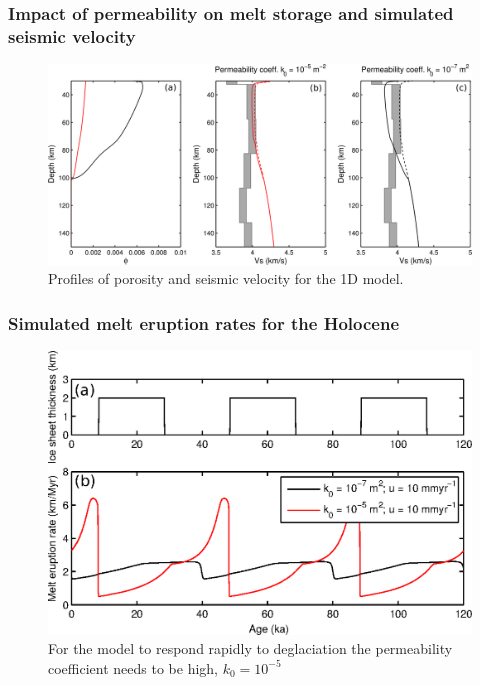 \documentclass[aspectratio=169]{beamer}
\begin{document}
\begin{frame}
    \frametitle{Impact of permeability on melt storage and simulated seismic velocity}
    \begin{figure}
        \includegraphics[height=0.7\paperheight]{./figures/iceland-profiles.png}
        \caption{Profiles of porosity and seismic velocity for the 1D model.}
    \end{figure}
\end{frame}


\begin{frame}
    \frametitle{Simulated melt eruption rates for the Holocene}
    \begin{figure}
        \includegraphics[height=0.7\paperheight]{./figures/iceland-response.png}
        \caption{For the model to respond rapidly to deglaciation the permeability coefficient needs to be high, $k_{0}=10^{-5}$}
    \end{figure}
\end{frame}
\end{document}
